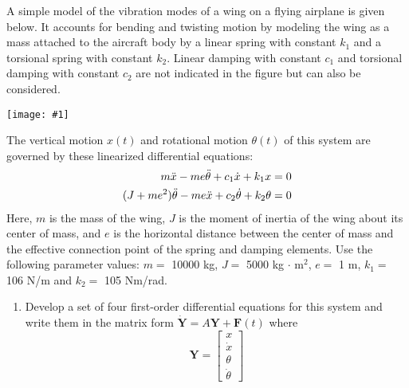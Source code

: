 \documentclass[12pt,letterpaper]{hmcpset}
\newcommand{\diagram}[2]{\begin{center}\texttt{[image: \#1]}\end{center}}
\begin{document}
	
	
	\begin{problem}[1]
		\setlength{\parskip}{3pt}
		A simple model of the vibration modes of a wing on a flying airplane is given below. It
		accounts for bending and twisting motion by modeling the wing as a mass attached to the
		aircraft body by a linear spring with constant $k_1$ and a torsional spring with constant $k_2$.
		Linear damping with constant $c_1$ and torsional damping with constant $c_2$ are not indicated in
		the figure but can also be considered.
		
		\diagram{Airplane}{5}
		
		The vertical motion $x(t)$ and rotational motion $\theta(t)$ of this system are governed by these
		linearized differential equations:
		\begin{displaymath}
		\begin{split}
		m\Ddot{x} - me\Ddot{\theta} + c_1 \Dot{x} + k_1 x &= 0\\
		(J + me^2)\Ddot{\theta} - me\Ddot{x} + c_2 \Dot{\theta} + k_2 \theta &= 0
		\end{split}
		\end{displaymath}
		Here, $m$ is the mass of the wing, $J$ is the moment of inertia of the wing about its center of
		mass, and $e$ is the horizontal distance between the center of mass and the effective connection
		point of the spring and damping elements.
		Use the following parameter values: $m =$ 10000 kg, $J =$ 5000 kg $\cdot$ m$^2$, $e =$ 1 m, $k_1 =$ 106 N/m
		and $k_2 =$ 105 Nm/rad.
		\begin{enumerate}
			\item Develop a set of four first-order differential equations for this system and write them in
			the matrix form $\Dot{\textbf{Y}} = A\textbf{Y} + \textbf{F}(t)$ where
			$$ \textbf{Y} = \begin{bmatrix}
				x\\
				\Dot{x}\\
				\theta\\
				\Dot{\theta}
				\end{bmatrix}
			$$
		\end{enumerate}
	\end{problem}
	
	\newpage
	
\end{document}
